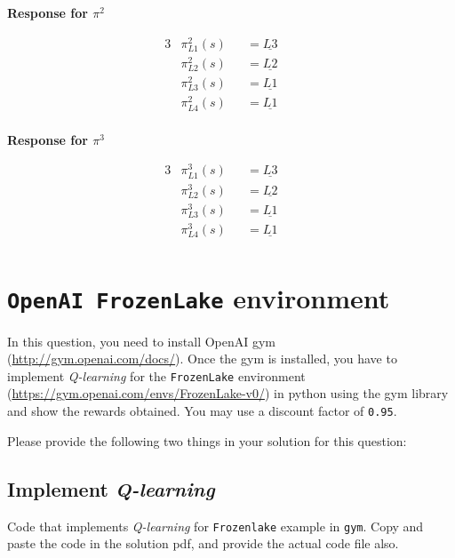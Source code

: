 \documentclass[12pt, letterpaper]{article}
\newcommand{\mybox}[1]{\par\noindent\colorbox{shadecolor}
{\parbox{\dimexpr\textwidth-2\fboxsep\relax}{#1}}}
\begin{document}
\textbf{Response for $\pi^2$}

\begin{alignat*}{3}
    &\pi^2_{L1}(s) &&= \underline{\textbf{$L3$}} && \\
    &\pi^2_{L2}(s) &&= \underline{\textbf{$L2$}} && \\
    &\pi^2_{L3}(s) &&= \underline{\textbf{$L1$}} && \\
    &\pi^2_{L4}(s) &&= \underline{\textbf{$L1$}} && \\
\end{alignat*}

\textbf{Response for $\pi^3$}

\begin{alignat*}{3}
    &\pi^3_{L1}(s) &&= \underline{\textbf{$L3$}} && \\
    &\pi^3_{L2}(s) &&= \underline{\textbf{$L2$}} && \\
    &\pi^3_{L3}(s) &&= \underline{\textbf{$L1$}} && \\
    &\pi^3_{L4}(s) &&= \underline{\textbf{$L1$}} && \\
\end{alignat*}

\section{\texttt{OpenAI FrozenLake} environment}

\mybox{In this question, you need to install OpenAI gym (\href{http://gym.openai.com/docs/}{http://gym.openai.com/docs/}). 
Once the gym is installed, you have to implement \textit{Q-learning} for the \texttt{FrozenLake} environment (\href{https://gym.openai.com/envs/FrozenLake-v0/}{https://gym.openai.com/envs/FrozenLake-v0/}) in python using the gym library and show the rewards obtained. 
You may use a discount factor of \texttt{0.95}.

Please provide the following two things in your solution for this question:}

\subsection{Implement \textit{Q-learning}}
\mybox{Code that implements \textit{Q-learning} for \texttt{Frozenlake} example in \texttt{gym}. 
Copy and paste the code in the solution pdf, and provide the actual code file also.}
\end{document}
